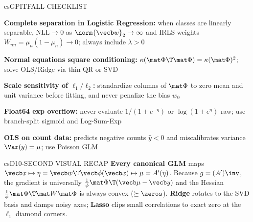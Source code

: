 \documentclass[../../../../master.tex]{subfiles}
\begin{document}
\begin{cscolumns}
\begin{cscard}{csG}{PITFALL CHECKLIST}
  \begin{csbul}
    \item \textbf{Complete separation in Logistic Regression:} when classes are linearly separable, $\mathrm{NLL}\to 0$ as $\norm{\vecb w}_2\to\infty$ and IRLS weights $W_{nn}=\mu_n(1-\mu_n)\to 0$; always include $\lambda>0$
    \item \textbf{Normal equations square conditioning:} $\kappa(\mat\Phi\T\mat\Phi)=\kappa(\mat\Phi)^2$; solve OLS/Ridge via thin QR or SVD
    \item \textbf{Scale sensitivity of $\ell_1/\ell_2$:} standardize columns of $\mat\Phi$ to zero mean and unit variance before fitting, and never penalize the bias $w_0$
    \item \textbf{Float64 exp overflow:} never evaluate $1/(1+e^{-\eta})$ or $\log(1+e^\eta)$ raw; use branch-split sigmoid and Log-Sum-Exp
    \item \textbf{OLS on count data:} predicts negative counts $\hat y<0$ and miscalibrates variance $\Var(y)=\mu$; use Poisson GLM
  \end{csbul}
\end{cscard}

\begin{cscard}{csD}{10-SECOND VISUAL RECAP}
  \sffamily\footnotesize
  \textbf{Every canonical GLM} maps $\vecb x\mapsto\eta=\vecb w\T\vecb\phi(\vecb x)\mapsto\mu=A'(\eta)$.
  Because $g=(A')\inv$, the gradient is universally $\frac{1}{\phi}\mat\Phi\T(\vecb\mu-\vecb y)$ and the Hessian $\frac{1}{\phi}\mat\Phi\T\mat W\mat\Phi$ is always convex ($\succeq\zeros$).
  \textbf{Ridge} rotates to the SVD basis and damps noisy axes; \textbf{Lasso} clips small correlations to exact zero at the $\ell_1$ diamond corners.
\end{cscard}
\end{cscolumns}

\csend
\end{document}
